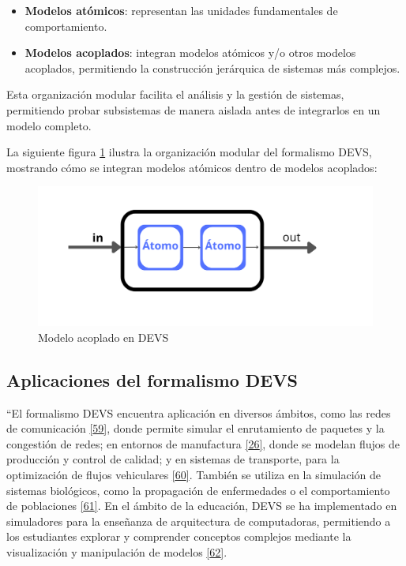 \documentclass[12pt,oneside]{templates/unerthesis}
\providecommand{\tightlist}{%
  \setlength{\itemsep}{0pt}\setlength{\parskip}{0pt}}
\begin{document}
\begin{itemize}
\tightlist
\item
  \textbf{Modelos atómicos}: representan las unidades fundamentales de comportamiento.
\item
  \textbf{Modelos acoplados}: integran modelos atómicos y/o otros modelos acoplados, permitiendo la construcción jerárquica de sistemas más complejos.
\end{itemize}

Esta organización modular facilita el análisis y la gestión de sistemas, permitiendo probar subsistemas de manera aislada antes de integrarlos en un modelo completo.

La siguiente figura \ref{fig:acoplado} ilustra la organización modular del formalismo DEVS, mostrando cómo se integran modelos atómicos dentro de modelos acoplados:

\begin{figure}

{\centering \includegraphics[width=1\linewidth]{images/acoplado} 

}

\caption{Modelo acoplado en DEVS}\label{fig:acoplado}
\end{figure}

\hypertarget{aplicaciones-del-formalismo-devs}{%
\subsection{Aplicaciones del formalismo DEVS}\label{aplicaciones-del-formalismo-devs}}

``El formalismo DEVS encuentra aplicación en diversos ámbitos, como las redes de comunicación \protect\hyperlink{ref-fujimoto2001parallel}{{[}59{]}}, donde permite simular el enrutamiento de paquetes y la congestión de redes; en entornos de manufactura \protect\hyperlink{ref-zeigler_theory_2000}{{[}26{]}}, donde se modelan flujos de producción y control de calidad; y en sistemas de transporte, para la optimización de flujos vehiculares \protect\hyperlink{ref-barros1997modeling}{{[}60{]}}. También se utiliza en la simulación de sistemas biológicos, como la propagación de enfermedades o el comportamiento de poblaciones \protect\hyperlink{ref-zeigler2004continuity}{{[}61{]}}. En el ámbito de la educación, DEVS se ha implementado en simuladores para la enseñanza de arquitectura de computadoras, permitiendo a los estudiantes explorar y comprender conceptos complejos mediante la visualización y manipulación de modelos \protect\hyperlink{ref-calvo2010simulador}{{[}62{]}}.
\end{document}
